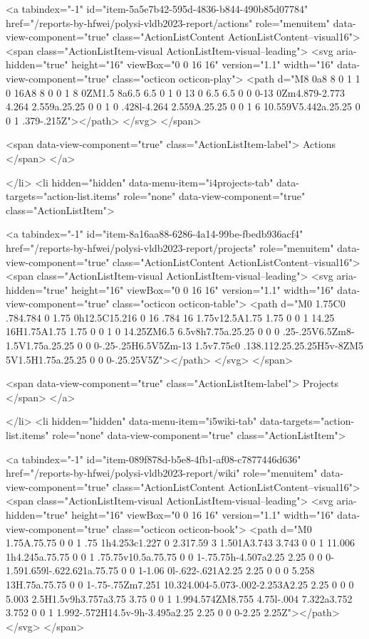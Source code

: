 {{    
    <a tabindex="-1" id="item-5a5e7b42-595d-4836-b844-490b85d07784" href="/reports-by-hfwei/polysi-vldb2023-report/actions" role="menuitem" data-view-component="true" class="ActionListContent ActionListContent--visual16">
        <span class="ActionListItem-visual ActionListItem-visual--leading">
          <svg aria-hidden="true" height="16" viewBox="0 0 16 16" version="1.1" width="16" data-view-component="true" class="octicon octicon-play">
    <path d="M8 0a8 8 0 1 1 0 16A8 8 0 0 1 8 0ZM1.5 8a6.5 6.5 0 1 0 13 0 6.5 6.5 0 0 0-13 0Zm4.879-2.773 4.264 2.559a.25.25 0 0 1 0 .428l-4.264 2.559A.25.25 0 0 1 6 10.559V5.442a.25.25 0 0 1 .379-.215Z"></path>
</svg>
        </span>
      
        <span data-view-component="true" class="ActionListItem-label">
          Actions
</span>      
</a>
  
</li>
        <li hidden="hidden" data-menu-item="i4projects-tab" data-targets="action-list.items" role="none" data-view-component="true" class="ActionListItem">
    
    
    <a tabindex="-1" id="item-8a16aa88-6286-4a14-99be-fbedb936acf4" href="/reports-by-hfwei/polysi-vldb2023-report/projects" role="menuitem" data-view-component="true" class="ActionListContent ActionListContent--visual16">
        <span class="ActionListItem-visual ActionListItem-visual--leading">
          <svg aria-hidden="true" height="16" viewBox="0 0 16 16" version="1.1" width="16" data-view-component="true" class="octicon octicon-table">
    <path d="M0 1.75C0 .784.784 0 1.75 0h12.5C15.216 0 16 .784 16 1.75v12.5A1.75 1.75 0 0 1 14.25 16H1.75A1.75 1.75 0 0 1 0 14.25ZM6.5 6.5v8h7.75a.25.25 0 0 0 .25-.25V6.5Zm8-1.5V1.75a.25.25 0 0 0-.25-.25H6.5V5Zm-13 1.5v7.75c0 .138.112.25.25.25H5v-8ZM5 5V1.5H1.75a.25.25 0 0 0-.25.25V5Z"></path>
</svg>
        </span>
      
        <span data-view-component="true" class="ActionListItem-label">
          Projects
</span>      
</a>
  
</li>
        <li hidden="hidden" data-menu-item="i5wiki-tab" data-targets="action-list.items" role="none" data-view-component="true" class="ActionListItem">
    
    
    <a tabindex="-1" id="item-089f878d-b5e8-4fb1-af08-c7877446d636" href="/reports-by-hfwei/polysi-vldb2023-report/wiki" role="menuitem" data-view-component="true" class="ActionListContent ActionListContent--visual16">
        <span class="ActionListItem-visual ActionListItem-visual--leading">
          <svg aria-hidden="true" height="16" viewBox="0 0 16 16" version="1.1" width="16" data-view-component="true" class="octicon octicon-book">
    <path d="M0 1.75A.75.75 0 0 1 .75 1h4.253c1.227 0 2.317.59 3 1.501A3.743 3.743 0 0 1 11.006 1h4.245a.75.75 0 0 1 .75.75v10.5a.75.75 0 0 1-.75.75h-4.507a2.25 2.25 0 0 0-1.591.659l-.622.621a.75.75 0 0 1-1.06 0l-.622-.621A2.25 2.25 0 0 0 5.258 13H.75a.75.75 0 0 1-.75-.75Zm7.251 10.324.004-5.073-.002-2.253A2.25 2.25 0 0 0 5.003 2.5H1.5v9h3.757a3.75 3.75 0 0 1 1.994.574ZM8.755 4.75l-.004 7.322a3.752 3.752 0 0 1 1.992-.572H14.5v-9h-3.495a2.25 2.25 0 0 0-2.25 2.25Z"></path>
</svg>
        </span>
      
}}
